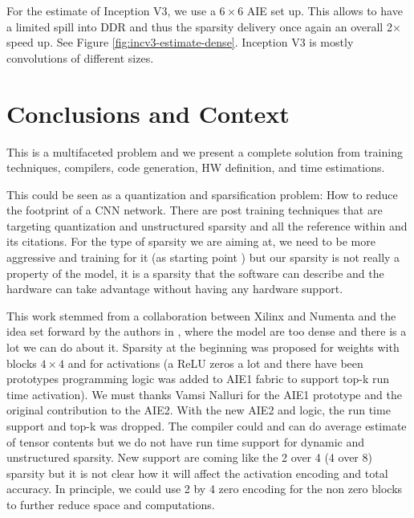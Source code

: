 \documentclass[conference]{IEEEtran}
\begin{document}
For the estimate of Inception V3, we use a $6\times 6$ AIE set up.
This allows to have a limited spill into DDR and thus the sparsity
delivery once again an overall 2$\times$ speed up. See Figure
\ref{fig:incv3-estimate-dense}. Inception V3 is mostly convolutions of
different sizes.







\section{Conclusions and Context}
This is a multifaceted problem and we present a complete solution from
training techniques, compilers, code generation, HW definition, and
time estimations.

This could be seen as a quantization and sparsification problem: How
to reduce the footprint of a CNN network. There are post training
techniques that are targeting quantization and unstructured sparsity
\cite{frantar2023gptq} and all the reference within and its
citations. For the type of sparsity we are aiming at, we need to be
more aggressive and training for it (as starting point
\cite{abs-2102-11289}) but our sparsity is not really a property of the
model, it is a sparsity that the software can describe and the
hardware can take advantage without having any hardware support.

This work stemmed from a collaboration between Xilinx and Numenta and
the idea set forward by the authors in \cite{ahmad2019dense}, where
the model are too dense and there is a lot we can do about
it. Sparsity at the beginning was proposed for weights with blocks
$4\times 4$ and for activations (a ReLU zeros a lot and there have
been prototypes programming logic was added to AIE1 fabric to support
top-k run time activation). We must thanks Vamsi Nalluri for the AIE1
prototype and the original contribution to the AIE2. With the new AIE2
and logic, the run time support and top-k was dropped. The compiler
could and can do average estimate of tensor contents but we do not
have run time support for dynamic and unstructured sparsity. New
support are coming like the 2 over 4 (4 over 8) sparsity but it is not
clear how it will affect the activation encoding and total
accuracy. In principle, we could use 2 by 4 zero encoding for the non
zero blocks to further reduce space and computations.
\end{document}
